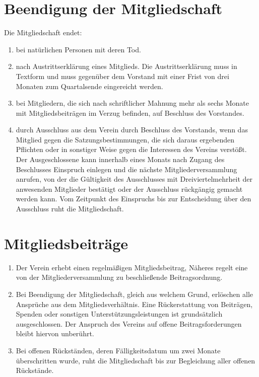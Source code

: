 \documentclass[12pt,a4paper,titlepage]{scrartcl}
\begin{document}
\section{Beendigung der Mitgliedschaft}

Die Mitgliedschaft endet:

\begin{enumerate}
\item bei natürlichen Personen mit deren Tod.
\item nach Austrittserklärung eines Mitglieds. Die Austrittserklärung muss in Textform und muss gegenüber dem Vorstand mit einer Frist von drei Monaten zum Quartalsende eingereicht werden.
\item  bei Mitgliedern, die sich nach schriftlicher Mahnung mehr als sechs Monate mit Mitgliedsbeiträgen im Verzug befinden, auf Beschluss des Vorstandes.
\item durch Ausschluss aus dem Verein durch Beschluss des Vorstands, wenn das Mitglied gegen die Satzungsbestimmungen, die sich daraus ergebenden Pflichten oder in sonstiger Weise gegen die Interessen des Vereins verstößt. Der Ausgeschlossene kann innerhalb eines Monats nach Zugang des Beschlusses Einspruch einlegen und die nächste Mitgliederversammlung anrufen, von der die Gültigkeit des Ausschlusses mit Dreiviertelmehrheit der anwesenden Mitglieder bestätigt oder der Ausschluss rückgängig gemacht werden kann. Vom Zeitpunkt des Einspruchs bis zur Entscheidung über den Ausschluss ruht die Mitgliedschaft.

\end{enumerate}

\section{Mitgliedsbeiträge}
\begin{enumerate}
\item Der Verein erhebt einen regelmäßigen Mitgliedsbeitrag, Näheres regelt eine von der
Mitgliederversammlung zu beschließende Beitragsordnung.
\item Bei Beendigung der Mitgliedschaft, gleich aus welchem Grund, erlöschen alle Ansprüche
aus dem Mitgliedsverhältnis. Eine Rückerstattung von Beiträgen, Spenden oder sonstigen Unterstützungsleistungen ist grundsätzlich ausgeschlossen. Der Anspruch des Vereins auf offene Beitragsforderungen bleibt hiervon unberührt.
\item  Bei offenen Rückständen, deren Fälligkeitsdatum um zwei Monate überschritten wurde, ruht die Mitgliedschaft bis zur Begleichung aller offenen Rückstände.

\end{enumerate}
\end{document}
